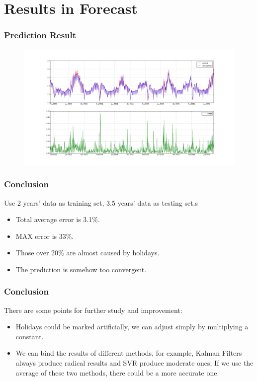 \section{Results in Forecast}
\begin{frame}
\frametitle{Prediction Result}
\begin{figure}
\includegraphics[width=\textwidth]{img/Pred.png}
\end{figure}
\end{frame}

\begin{frame}
\frametitle{Conclusion}
Use 2 years' data as training set, 3.5 years' data as testing set.s
\begin{itemize}
	\item Total average error is 3.1\%.
	\item MAX error is 33\%.
	\item Those over 20\% are almost caused by holidays.
	\item The prediction is somehow too convergent.
\end{itemize}
\end{frame}

\begin{frame}
\frametitle{Conclusion}
There are some points for further study and improvement:
\begin{itemize}
	\item Holidays could be marked artificially, we can adjust simply by multiplying a constant.
	\item We can bind the results of different methods, for example, Kalman Filters always produce radical results and SVR produce moderate ones; If we use the average of these two methods, there could be a more accurate one.
\end{itemize}
\end{frame}







